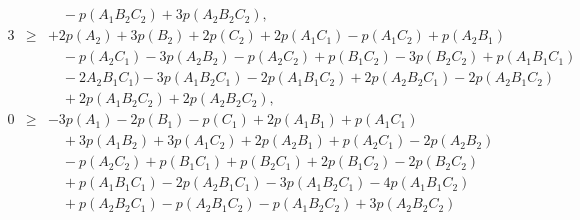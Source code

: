 \begin{eqnarray}
\nonumber\\&&\quad
-p(A_1B_2C_2)+3p(A_2B_2C_2)
\label{eghz-5}
,\\
3&\ge& +2p(A_2)+3p(B_2)+2p(C_2)+2p(A_1C_1)-p(A_1C_2)+p(A_2B_1)
\nonumber\\&&\quad
-p(A_2C_1)-3p(A_2B_2)-p(A_2C_2)+p(B_1C_2)-3p(B_2C_2)+p(A_1B_1C_1)
\nonumber\\&&\quad
-2A_2B_1C_1)-3p(A_1B_2C_1)-2p(A_1B_1C_2)+2p(A_2B_2C_1)-2p(A_2B_1C_2)
\nonumber\\&&\quad
+2p(A_1B_2C_2)+2p(A_2B_2C_2)
\label{eghz-6}
,\\
 0 &\ge&  -3p(A_1) -2p(B_1) - p(C_1) +2p(A_1B_1) + p(A_1C_1)
\nonumber\\&&\quad
 +3p(A_1B_2) +3p(A_1C_2) +2p(A_2B_1) + p(A_2C_1) -2p(A_2B_2)
\nonumber\\&&\quad
- p(A_2C_2) + p(B_1C_1) + p(B_2C_1) +2p(B_1C_2) -2p(B_2C_2)
\nonumber\\&&\quad
+ p(A_1B_1C_1) -2p(A_2B_1C_1) -3p(A_1B_2C_1) -4p(A_1B_1C_2)
\nonumber\\&&\quad
+ p(A_2B_2C_1) - p(A_2B_1C_2) - p(A_1B_2C_2) +3p(A_2B_2C_2)
\label{eghz-7}
\end{eqnarray}

